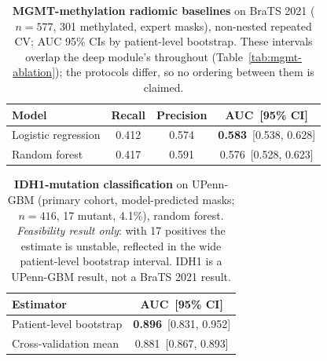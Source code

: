 \begin{table}[t]
  \centering
  \caption[MGMT radiomic baselines]{\textbf{MGMT-methylation radiomic
  baselines} on BraTS 2021 ($n=577$, 301 methylated, expert masks), non-nested
  repeated CV; AUC 95\% CIs by patient-level bootstrap. These intervals overlap
  the deep module's throughout (Table~\ref{tab:mgmt-ablation}); the protocols
  differ, so no ordering between them is claimed.}
  \label{tab:mgmt-radiomic}
  \begin{tabular}{lccc}
    \toprule
    Model & Recall & Precision & AUC~[95\% CI] \\
    \midrule
    Logistic regression & 0.412 & 0.574 & \textbf{0.583}~[0.538, 0.628] \\
    Random forest       & 0.417 & 0.591 & 0.576~[0.528, 0.623] \\
    \bottomrule
  \end{tabular}
\end{table}

\begin{table}[t]
  \centering
  \caption[IDH1 classification]{\textbf{IDH1-mutation classification} on
  UPenn-GBM (primary cohort, model-predicted masks; $n=416$, 17 mutant, 4.1\%),
  random forest. \emph{Feasibility result only}: with 17 positives the estimate
  is unstable, reflected in the wide patient-level bootstrap interval. IDH1 is a
  UPenn-GBM result, not a BraTS 2021 result.}
  \label{tab:idh1}
  \begin{tabular}{lc}
    \toprule
    Estimator & AUC~[95\% CI] \\
    \midrule
    Patient-level bootstrap & \textbf{0.896}~[0.831, 0.952] \\
    Cross-validation mean   & 0.881~[0.867, 0.893] \\
    \bottomrule
  \end{tabular}
\end{table}

